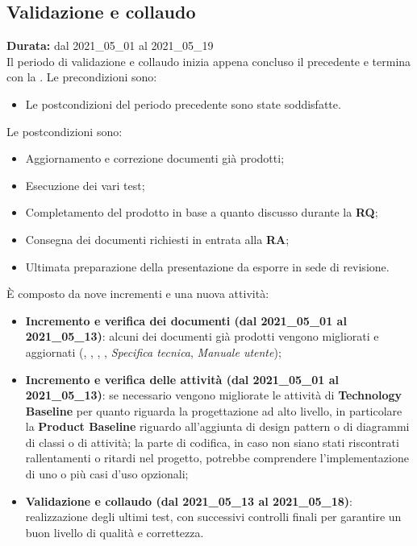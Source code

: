 \subsection{Validazione e collaudo}
\label{validazione_e_collaudo}
\textbf{Durata:} dal 2021\_05\_01 al 2021\_05\_19\\
Il periodo di validazione e collaudo inizia appena concluso il precedente e termina con la .
Le precondizioni sono:
\begin{itemize}
    \item Le postcondizioni del periodo precedente sono state soddisfatte.
\end{itemize}
Le postcondizioni sono:
\begin{itemize}
    \item Aggiornamento e correzione documenti già prodotti;
    \item Esecuzione dei vari test;
    \item Completamento del prodotto in base a quanto discusso durante la \textbf{RQ};
    \item Consegna dei documenti richiesti in entrata alla \textbf{RA};
    \item Ultimata preparazione della presentazione da esporre in sede di revisione.
\end{itemize}
È composto da nove incrementi e una nuova attività:
\begin{itemize}
    \item \textbf{Incremento e verifica dei documenti (dal 2021\_05\_01 al 2021\_05\_13)}: alcuni dei documenti già prodotti vengono migliorati e aggiornati ({\NdP}, {\PdP}, {\Glossario}, {\PdQ}, \textit{Specifica tecnica}, \textit{Manuale utente}); 
    \item \textbf{Incremento e verifica delle attività (dal 2021\_05\_01 al 2021\_05\_13)}: se necessario vengono migliorate le attività di \textbf{Technology Baseline} per quanto riguarda la progettazione ad alto livello, in particolare la \textbf{Product Baseline} riguardo all'aggiunta di design pattern o di diagrammi di classi o di attività; la parte di codifica, in caso non siano stati riscontrati rallentamenti o ritardi nel progetto, potrebbe comprendere l'implementazione di uno o più casi d'uso opzionali;
    \item \textbf{Validazione e collaudo (dal 2021\_05\_13 al 2021\_05\_18)}: realizzazione degli ultimi test, con successivi controlli finali per garantire un buon livello di qualità e correttezza.
\end{itemize}
